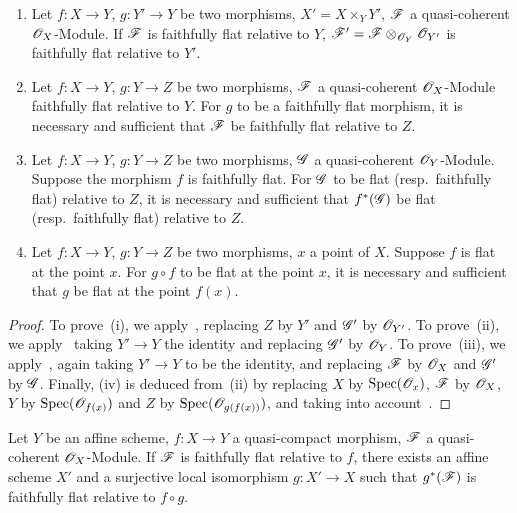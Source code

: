 \begin{corollary}[2.2.11]
\label{IV.2.2.11}
\medskip\noindent
\begin{enumerate}
  \item[\textnormal{(i)}] Let $f:X\to Y$, $g:Y'\to Y$ be two morphisms, $X'=X\times_Y Y'$, $\mathscr{F}$ a quasi-coherent $\mathscr{O}_X$-Module. If $\mathscr{F}$ is faithfully flat relative to $Y$, $\mathscr{F}'=\mathscr{F}\otimes_{\mathscr{O}_Y}\mathscr{O}_{Y'}$ is faithfully flat relative to $Y'$.
  \item[\textnormal{(ii)}] Let $f:X\to Y$, $g:Y\to Z$ be two morphisms, $\mathscr{F}$ a quasi-coherent $\mathscr{O}_X$-Module faithfully flat relative to $Y$.
    For $g$ to be a faithfully flat morphism, it is necessary and sufficient that $\mathscr{F}$ be faithfully flat relative to $Z$.
  \item[\textnormal{(iii)}] Let $f:X\to Y$, $g:Y\to Z$ be two morphisms, $\mathscr{G}$ a quasi-coherent $\mathscr{O}_Y$-Module.
    Suppose the morphism $f$ is faithfully flat.
    For $\mathscr{G}$ to be flat \textnormal{(resp.}\ faithfully flat\textnormal{)} relative to $Z$, it is necessary and sufficient that $f^*(\mathscr{G})$ be flat \textnormal{(resp.}\ faithfully flat\textnormal{)} relative to $Z$.
  \item[\textnormal{(iv)}] Let $f:X\to Y$, $g:Y\to Z$ be two morphisms, $x$ a point of $X$.
    Suppose $f$ is flat at the point $x$. For $g\circ f$ to be flat at the point $x$, it is necessary and sufficient that $g$ be flat at the point $f(x)$.
\end{enumerate}
\end{corollary}

\begin{proof}
To prove~(i), we apply~, replacing $Z$ by $Y'$ and $\mathscr{G}'$ by $\mathscr{O}_{Y'}$.
To prove~(ii), we apply~ taking $Y'\to Y$ the identity and replacing $\mathscr{G}'$ by $\mathscr{O}_Y$.
To prove~(iii), we apply~, again taking $Y'\to Y$ to be the identity, and replacing $\mathscr{F}$ by $\mathscr{O}_X$ and $\mathscr{G}'$ by $\mathscr{G}$.
Finally, (iv) is deduced from~(ii) by replacing $X$ by $\operatorname{Spec}(\mathscr{O}_x)$, $\mathscr{F}$ by $\mathscr{O}_X$, $Y$ by $\operatorname{Spec}(\mathscr{O}_{f(x)})$ and $Z$ by $\operatorname{Spec}(\mathscr{O}_{g(f(x))})$, and taking into account~.
\end{proof}

\begin{corollary}[2.2.12]
\label{IV.2.2.12}
Let $Y$ be an affine scheme, $f:X\to Y$ a quasi-compact morphism,
$\mathscr{F}$ a quasi-coherent $\mathscr{O}_X$-Module.
If $\mathscr{F}$ is faithfully flat relative to $f$, there exists an affine scheme $X'$ and a surjective local isomorphism $g:X'\to X$ such that $g^*(\mathscr{F})$ is faithfully flat relative to $f\circ g$.
\end{corollary}

